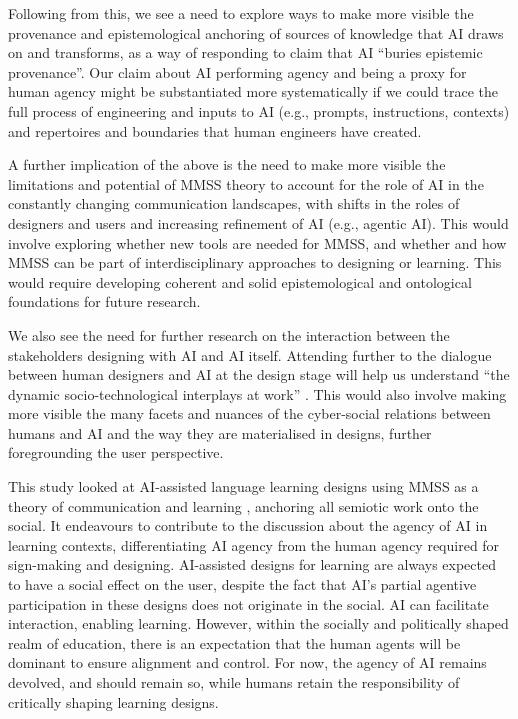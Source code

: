 \documentclass[english]{textolivre}
\begin{document}
Following from this, we see a need to explore ways to make more visible the provenance and epistemological anchoring of sources of knowledge that AI draws on and transforms, as a way of responding to  claim that AI “buries epistemic provenance”. Our claim about AI performing agency and being a proxy for human agency might be substantiated more systematically if we could trace the full process of engineering and inputs to AI (e.g., prompts, instructions, contexts) and repertoires and boundaries that human engineers have created.

A further implication of the above is the need to make more visible the limitations and potential of MMSS theory to account for the role of AI in the constantly changing communication landscapes, with shifts in the roles of designers and users and increasing refinement of AI (e.g., agentic AI). This would involve exploring whether new tools are needed for MMSS, and whether and how MMSS can be part of interdisciplinary approaches to designing or learning. This would require developing coherent and solid epistemological and ontological foundations for future research.

We also see the need for further research on the interaction between the stakeholders designing with AI and AI itself. Attending further to the dialogue between human designers and AI at the design stage will help us understand “the dynamic socio-technological interplays at work” \cite[p. 3626]{karimova2025dialogic}. This would also involve making more visible the many facets and nuances of the cyber-social relations between humans and AI \cite{karatza2024multimodal} and the way they are materialised in designs, further foregrounding the user perspective.

This study looked at AI-assisted language learning designs using MMSS as a theory of communication and learning \cite{bezemer2016multimodality}, anchoring all semiotic work onto the social. It endeavours to contribute to the discussion about the agency of AI in learning contexts, differentiating AI agency from the human agency required for sign-making and designing. AI-assisted designs for learning are always expected to have a social effect on the user, despite the fact that AI’s partial agentive participation in these designs does not originate in the social. AI can facilitate interaction, enabling learning. However, within the socially and politically shaped realm of education, there is an expectation that the human agents will be dominant to ensure alignment and control. For now, the agency of AI remains devolved, and should remain so, while humans retain the responsibility of critically shaping learning designs.
\end{document}
